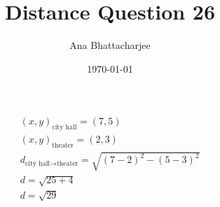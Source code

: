 \documentclass{article}
\begin{document}
\author{Ana Bhattacharjee}
\title{Distance Question 26}
\date{\today}
\maketitle{}

\begin{center}
  \begin{align}
    (x,y)_{\text{city hall}} = (7,5) \\
    (x,y)_{\text{theater}} = (2,3) \\
    d_{\text{city hall} \rightarrow \text{theater}} = \sqrt{(7 - 2)^2 - (5 - 3)^2} \\
    d = \sqrt{25 + 4} \\
    d = \sqrt{29}
  \end{align}
\end{center}
\end{document}
